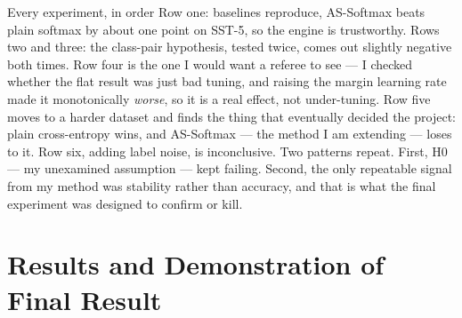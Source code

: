 \begin{frame}{Every experiment, in order}
{    Row one: baselines reproduce, AS-Softmax beats plain softmax by about one
    point on SST-5, so the engine is trustworthy. Rows two and three: the
    class-pair hypothesis, tested twice, comes out slightly negative both times.
    Row four is the one I would want a referee to see --- I checked whether the
    flat result was just bad tuning, and raising the margin learning rate made
    it monotonically \emph{worse}, so it is a real effect, not under-tuning.
    Row five moves to a harder dataset and finds the thing that eventually
    decided the project: plain cross-entropy wins, and AS-Softmax --- the method
    I am extending --- loses to it. Row six, adding label noise, is
    inconclusive. Two patterns repeat. First, H0 --- my unexamined assumption ---
    kept failing. Second, the only repeatable signal from my method was
    stability rather than accuracy, and that is what the final experiment was
    designed to confirm or kill.%
  }
\end{frame}

\section{Results and Demonstration of Final Result}

